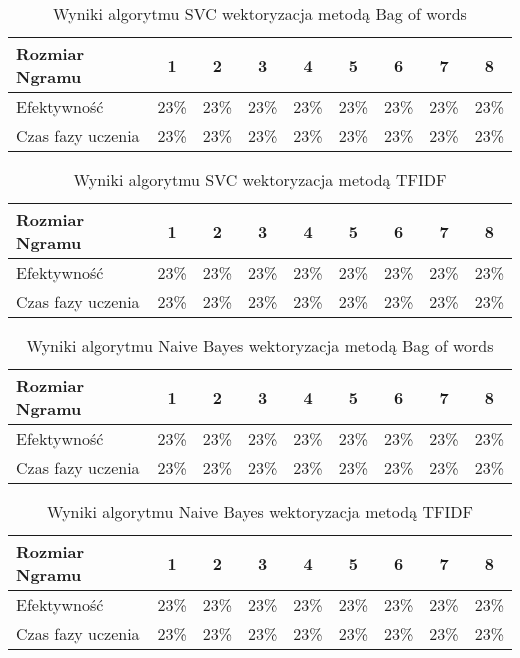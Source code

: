 \begin{table}[h!]
    \centering
    \begin{tabular}{ | l | c | c | c | c | c | c | c | c |}
        \hline
        Rozmiar Ngramu & 1 & 2 & 3 & 4 & 5 & 6 & 7 & 8  \\ \hline
        Efektywność & 23\% & 23\% & 23\% & 23\% & 23\% & 23\% & 23\% & 23\%   \\ \hline
        Czas fazy uczenia & 23\% & 23\% & 23\% & 23\% & 23\% & 23\% & 23\% & 23\%  \\ \hline
    \end{tabular}
    \caption{Wyniki algorytmu SVC wektoryzacja metodą Bag of words}
\end{table}

\begin{table}[h!]
    \centering
    \begin{tabular}{ | l | c | c | c | c | c | c | c | c |}
        \hline
        Rozmiar Ngramu & 1 & 2 & 3 & 4 & 5 & 6 & 7 & 8  \\ \hline
        Efektywność & 23\% & 23\% & 23\% & 23\% & 23\% & 23\% & 23\% & 23\%   \\ \hline
        Czas fazy uczenia & 23\% & 23\% & 23\% & 23\% & 23\% & 23\% & 23\% & 23\%  \\ \hline
    \end{tabular}
    \caption{Wyniki algorytmu SVC wektoryzacja metodą TFIDF}
\end{table}

\begin{table}[h!]
    \centering
    \begin{tabular}{ | l | c | c | c | c | c | c | c | c |}
        \hline
        Rozmiar Ngramu & 1 & 2 & 3 & 4 & 5 & 6 & 7 & 8  \\ \hline
        Efektywność & 23\% & 23\% & 23\% & 23\% & 23\% & 23\% & 23\% & 23\%   \\ \hline
        Czas fazy uczenia & 23\% & 23\% & 23\% & 23\% & 23\% & 23\% & 23\% & 23\%  \\ \hline
    \end{tabular}
    \caption{Wyniki algorytmu Naive Bayes wektoryzacja metodą Bag of words}
\end{table}

\begin{table}[h!]
    \centering
    \begin{tabular}{ | l | c | c | c | c | c | c | c | c |}
        \hline
        Rozmiar Ngramu & 1 & 2 & 3 & 4 & 5 & 6 & 7 & 8  \\ \hline
        Efektywność & 23\% & 23\% & 23\% & 23\% & 23\% & 23\% & 23\% & 23\%   \\ \hline
        Czas fazy uczenia & 23\% & 23\% & 23\% & 23\% & 23\% & 23\% & 23\% & 23\%  \\ \hline
    \end{tabular}
    \caption{Wyniki algorytmu Naive Bayes wektoryzacja metodą TFIDF}
\end{table}

